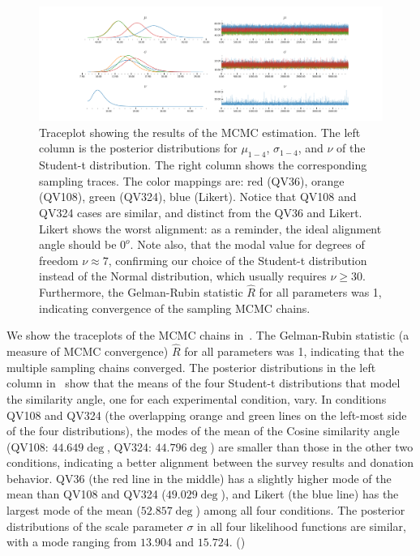 \begin{figure}
  \centering
  \includegraphics[trim= 2in 0in 2in 0in, clip, width=\textwidth, keepaspectratio=true]{content/image/StudentTIndep_VA_traceplot.pdf}
  \caption{
    Traceplot showing the results of the MCMC estimation. The left column is the posterior distributions for $\mu_{1-4}$, $\sigma_{1-4}$, and $\nu$ of the Student-t distribution. The right column shows the corresponding sampling traces. The color mappings are: red (QV36), orange (QV108), green (QV324), blue (Likert). Notice that QV108 and QV324 cases are similar, and distinct from the QV36 and Likert. Likert shows the worst alignment: as a reminder, the ideal alignment angle should be $0^o$. Note also, that the modal value for degrees of freedom $\nu \approx 7$, confirming our choice of the Student-t distribution instead of the Normal distribution, which usually requires $\nu \geq 30$. Furthermore, the Gelman-Rubin statistic $\hat{R}$ for all parameters was 1, indicating  convergence of the sampling MCMC chains.
  }
  \label{fig:traceplot_exp1}
\end{figure}


We show the traceplots of the MCMC chains in~. The Gelman-Rubin statistic (a measure of MCMC convergence) $\hat{R}$ for all parameters was 1, indicating that the multiple sampling chains converged.
The posterior distributions in the left column in~ show that the means of the four Student-t distributions that model the similarity angle, one for each experimental condition, vary. 
In conditions QV108 and QV324 (the overlapping orange and green lines on the left-most side of the four distributions),
the modes of the mean of the Cosine similarity angle 
(QV108: $44.649 \deg$, QV324: $44.796 \deg$) 
are smaller than those in the other two conditions, 
indicating a better alignment 
between the survey results and donation behavior. 
QV36 (the red line in the middle) has a slightly higher mode of the mean than QV108 and QV324 ($49.029 \deg$), and Likert (the blue line) has the largest mode of the mean ($52.857 \deg$) 
among all four conditions. 
The posterior distributions of the scale parameter $\sigma$
in all four likelihood functions are similar, 
with a mode ranging from $13.904$ and $15.724$. 
()

